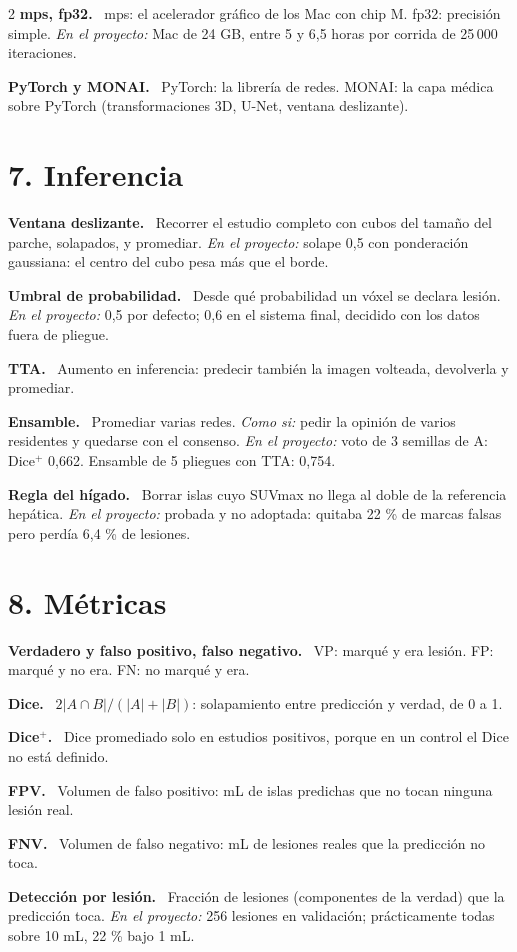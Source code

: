 \documentclass[9pt,a4paper]{extarticle}
\newcommand{\T}[1]{{\sffamily\bfseries\color{tinta}#1.}\ }
\newcommand{\aqui}[1]{{\color{acento}\itshape En el proyecto:} #1}
\newcommand{\como}[1]{{\itshape Como si:} #1}
\begin{document}
\begin{multicols}{2}
\T{mps, fp32} mps: el acelerador gráfico de los Mac con chip M. fp32: precisión simple. \aqui{Mac de 24 GB, entre 5 y 6,5 horas por corrida de 25\,000 iteraciones.}

\T{PyTorch y MONAI} PyTorch: la librería de redes. MONAI: la capa médica sobre PyTorch (transformaciones 3D, U-Net, ventana deslizante).

\section{7. Inferencia}

\T{Ventana deslizante} Recorrer el estudio completo con cubos del tamaño del parche, solapados, y promediar. \aqui{solape 0,5 con ponderación gaussiana: el centro del cubo pesa más que el borde.}

\T{Umbral de probabilidad} Desde qué probabilidad un vóxel se declara lesión. \aqui{0,5 por defecto; 0,6 en el sistema final, decidido con los datos fuera de pliegue.}

\T{TTA} Aumento en inferencia: predecir también la imagen volteada, devolverla y promediar.

\T{Ensamble} Promediar varias redes. \como{pedir la opinión de varios residentes y quedarse con el consenso.} \aqui{voto de 3 semillas de A: Dice$^{+}$ 0,662. Ensamble de 5 pliegues con TTA: 0,754.}

\T{Regla del hígado} Borrar islas cuyo SUVmax no llega al doble de la referencia hepática. \aqui{probada y no adoptada: quitaba 22 \% de marcas falsas pero perdía 6,4 \% de lesiones.}

\section{8. Métricas}

\T{Verdadero y falso positivo, falso negativo} VP: marqué y era lesión. FP: marqué y no era. FN: no marqué y era.

\T{Dice} $2|A \cap B| / (|A|+|B|)$: solapamiento entre predicción y verdad, de 0 a 1.

\T{Dice$^{+}$} Dice promediado solo en estudios positivos, porque en un control el Dice no está definido.

\T{FPV} Volumen de falso positivo: mL de islas predichas que no tocan ninguna lesión real.

\T{FNV} Volumen de falso negativo: mL de lesiones reales que la predicción no toca.

\T{Detección por lesión} Fracción de lesiones (componentes de la verdad) que la predicción toca. \aqui{256 lesiones en validación; prácticamente todas sobre 10 mL, 22 \% bajo 1 mL.}


\end{multicols}
\end{document}
